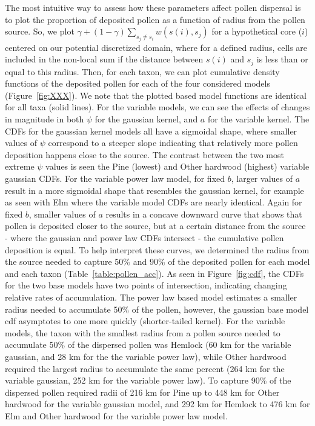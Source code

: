 \documentclass[12pt]{article}
\begin{document}
The most intuitive way to assess how these parameters affect pollen
dispersal is to plot the proportion of deposited pollen as a function
of radius from the pollen source. So, we plot $\gamma + (1- \gamma)
\sum_{s_j \neq s_i} w(s(i), s_j)$ for a hypothetical core ($i$)
centered on our potential discretized domain, where for a defined
radius, cells are included in the non-local sum if the distance
between $s(i)$ and $s_j$ is less than or equal to this radius. Then,
for each taxon, we can plot cumulative density functions of the
deposited pollen for each of the four considered models
(Figure~\ref{fig:XXX}). We note that the plotted based model functions
are identical for all taxa (solid lines).  For the variable models, we
can see the effects of changes in magnitude in both $\psi$ for the
gaussian kernel, and $a$ for the variable kernel. The CDFs for the
gaussian kernel models all have a sigmoidal shape, where smaller
values of $\psi$ correspond to a steeper slope indicating that
relatively more pollen deposition happens close to the source. The
contrast between the two most extreme $\psi$ values is seen the Pine
(lowest) and Other hardwood (highest) variable gaussian CDFs. For the
variable power law model, for fixed $b$, larger values of $a$ result
in a more sigmoidal shape that resembles the gaussian kernel, for
example as seen with Elm where the variable model CDFs are nearly
identical. Again for fixed $b$, smaller values of $a$ results in a
concave downward curve that shows that pollen is deposited closer to
the source, but at a certain distance from the source - where the
gaussian and power law CDFs intersect - the cumulative pollen
deposition is equal. To help interpret these curves, we determined the
radius from the source needed to capture 50\% and 90\% of the
deposited pollen for each model and each taxon
(Table~\ref{table:pollen_acc}). As seen in Figure~\ref{fig:cdf}, the
CDFs for the two base models have two points of intersection,
indicating changing relative rates of accumulation. The power law
based model estimates a smaller radius needed to accumulate 50\% of
the pollen, however, the gaussian base model cdf asymptotes to one
more quickly (shorter-tailed kernel). For the variable models, the
taxon with the smallest radius from a pollen source needed to
accumulate 50\% of the dispersed pollen was Hemlock (60 km for the
variable gaussian, and 28 km for the the variable power law), while
Other hardwood required the largest radius to accumulate the same
percent (264 km for the variable gaussian, 252 km for the variable
power law). To capture 90\% of the dispersed pollen required radii of
216 km for Pine up to 448 km for Other hardwood for the variable
gaussian model, and 292 km for Hemlock to 476 km for Elm and Other
hardwood for the variable power law model.
\end{document}

